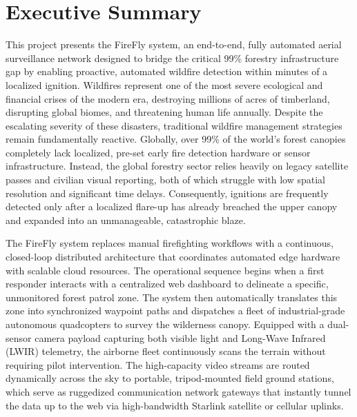 \documentclass[journal, onecolumn]{IEEEtran}
\begin{document}
\newpage

\section{Executive Summary}

This project presents the FireFly system, an end-to-end, fully automated aerial surveillance network designed to bridge the critical 99\% forestry infrastructure gap by enabling proactive, automated wildfire detection within minutes of a localized ignition. Wildfires represent one of the most severe ecological and financial crises of the modern era, destroying millions of acres of timberland, disrupting global biomes, and threatening human life annually. Despite the escalating severity of these disasters, traditional wildfire management strategies remain fundamentally reactive. Globally, over 99\% of the world's forest canopies completely lack localized, pre-set early fire detection hardware or sensor infrastructure. Instead, the global forestry sector relies heavily on legacy satellite passes and civilian visual reporting, both of which struggle with low spatial resolution and significant time delays. Consequently, ignitions are frequently detected only after a localized flare-up has already breached the upper canopy and expanded into an unmanageable, catastrophic blaze.

The FireFly system replaces manual firefighting workflows with a continuous, closed-loop distributed architecture that coordinates automated edge hardware with scalable cloud resources. The operational sequence begins when a first responder interacts with a centralized web dashboard to delineate a specific, unmonitored forest patrol zone. The system then automatically translates this zone into synchronized waypoint paths and dispatches a fleet of industrial-grade autonomous quadcopters to survey the wilderness canopy. Equipped with a dual-sensor camera payload capturing both visible light and Long-Wave Infrared (LWIR) telemetry, the airborne fleet continuously scans the terrain without requiring pilot intervention. The high-capacity video streams are routed dynamically across the sky to portable, tripod-mounted field ground stations, which serve as ruggedized communication network gateways that instantly tunnel the data up to the web via high-bandwidth Starlink satellite or cellular uplinks. 
\end{document}

